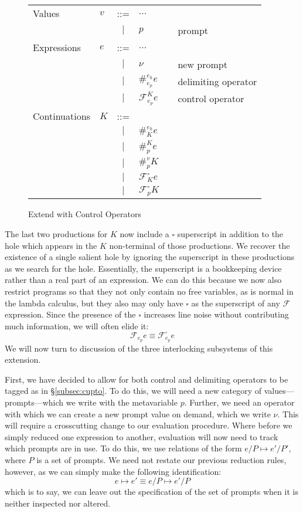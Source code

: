 \documentclass[11pt]{article}
\newcommand\F{\mathcal{F}}
\begin{document}
\begin{figure}[H]
\caption{Extend with Control Operators}
\label{fig:addControl}

\begin{tabular}{llclll}
Values & $v$ & ::= & $\ldots$ \\
& & $|$ & $p$ && prompt \\
Expressions & $e$ & ::= & $\ldots$ \\
& & $|$ & $\nu$ && new prompt \\
& & $|$ & $\#_{e_p}^{e_h}e$ && delimiting operator \\
& & $|$ & $\F_{e_p}^Ke$ && control operator \\
Continuations & $K$ & ::= & \\
& & $|$ & $\#_{K}^{e_h}e$ &&  \\
& & $|$ & $\#_{p}^{K}e$ &&  \\
& & $|$ & $\#_{p}^{v}K$ &&  \\
& & $|$ & $\F_{K}^{\square}e$ &&  \\
& & $|$ & $\F_{p}^{\square}K$ &&  \\
\end{tabular}
\end{figure}

The last two productions for $K$ now include a $\square$ superscript in addition to the hole which appears in the $K$ non-terminal of those productions.
We recover the existence of a single salient hole by ignoring the superscript in these productions as we search for the hole.
Essentially, the superscript is a bookkeeping device rather than a real part of an expression.
We can do this because we now also restrict programs so that they not only contain no free variables, as is normal in the lambda calculus, but they also may only have $\square$ as the superscript of any $\F$ expression.
Since the presence of the $\square$ increases line noise without contributing much information, we will often elide it:
$$\F_{e_p}e \equiv \F_{e_p}^{\square}e$$
We will now turn to discussion of the three interlocking subsystems of this extension.

First, we have decided to allow for both control and delimiting operators to be tagged as in \S\ref{subsec:cupto}.
To do this, we will need a new category of values---prompts---which we write with the metavariable $p$.
Further, we need an operator with which we can create a new prompt value on demand, which we write $\nu$.
This will require a crosscutting change to our evaluation procedure.
Where before we simply reduced one expression to another, evaluation will now need to track which prompts are in use.
To do this, we use relations of the form $e/P \mapsto e'/P'$, where $P$ is a set of prompts.
We need not restate our previous reduction rules, however, as we can simply make the following identification:
$$e \mapsto e' \equiv e/P \mapsto e'/P$$
which is to say, we can leave out the specification of the set of prompts when it is neither inspected nor altered.
\end{document}
